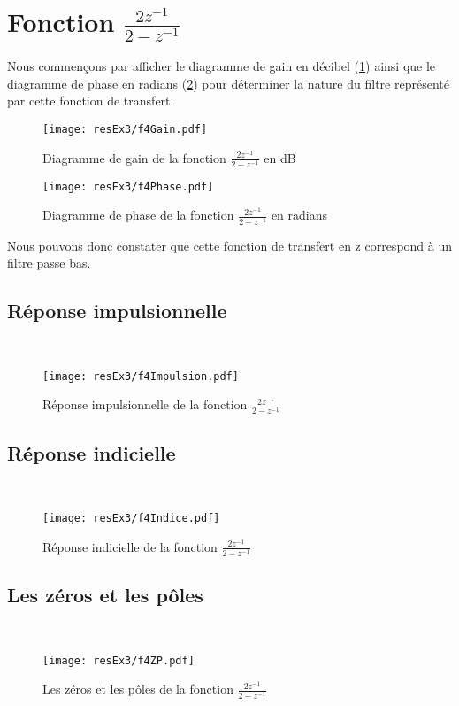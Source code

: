 \section{Fonction $\frac{2z^{-1}}{2-z^{-1}}$}
Nous commençons par afficher le diagramme de gain en décibel (\ref{f4 Diagramme de gain}) ainsi que le diagramme de phase en radians (\ref{f4 Diagramme de phase}) pour déterminer la nature du filtre représenté par cette fonction de transfert.
\begin{figure}[H]
\centering
\texttt{[image: resEx3/f4Gain.pdf]}
\caption{Diagramme de gain de la fonction $\frac{2z^{-1}}{2-z^{-1}}$ en dB}
\label{f4 Diagramme de gain}
\end{figure}
\begin{figure}[H]
\centering
\texttt{[image: resEx3/f4Phase.pdf]}
\caption{Diagramme de phase de la fonction $\frac{2z^{-1}}{2-z^{-1}}$ en radians}
\label{f4 Diagramme de phase}
\end{figure}
Nous pouvons donc constater que cette fonction de transfert en z correspond à un filtre passe bas.
\subsection{Réponse impulsionnelle}
~\\
\begin{figure}[H]
\centering
\texttt{[image: resEx3/f4Impulsion.pdf]}
\caption{Réponse impulsionnelle de la fonction $\frac{2z^{-1}}{2-z^{-1}}$}
\end{figure}

\subsection{Réponse indicielle}
~\\
\begin{figure}[H]
\centering
\texttt{[image: resEx3/f4Indice.pdf]}
\caption{Réponse indicielle de la fonction $\frac{2z^{-1}}{2-z^{-1}}$}
\end{figure}

\subsection{Les zéros et les pôles}
~\\
\begin{figure}[H]
\centering
\texttt{[image: resEx3/f4ZP.pdf]}
\caption{Les zéros et les pôles de la fonction $\frac{2z^{-1}}{2-z^{-1}}$ }
\end{figure}


